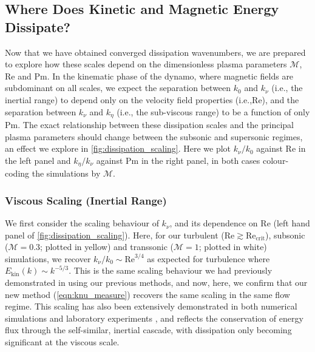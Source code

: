 \documentclass[12pt,twoside]{extreport}
\makeatletter
\newcommand{\mReh}{\ensuremath{\mathrm{Re}}} %
\newcommand{\mPrm}{\ensuremath{\mathrm{Pm}}} %
\newcommand{\mSonicMach}{\ensuremath{\mathcal{M}}} %
\newcommand{\ie}{i.e.,\xspace} %
\providecommand{\DIFaddtex}[1]{{\protect\color{DIFgreen}\uwave{#1}}} %
\providecommand{\DIFdeltex}[1]{{\protect\color{DIFpurple}\sout{#1}}} %
\providecommand{\DIFaddbegin}{} %
\providecommand{\DIFaddend}{} %
\providecommand{\DIFdelbegin}{} %
\providecommand{\DIFdelend}{} %
\providecommand{\DIFadd}[1]{\texorpdfstring{\DIFaddtex{#1}}{#1}} %
\providecommand{\DIFdel}[1]{\texorpdfstring{\DIFdeltex{#1}}{}} %
\providecommand{\DIFscaledelfig}{0.5}
\newlength{\DIFdelgraphicswidth} %
\newlength{\DIFdelgraphicsheight} %
\providecommand{\DIFaddincludegraphics}[2][]{{\color{DIFgreen}\fbox{\DIFOincludegraphics[#1]{#2}}}} %
\providecommand{\DIFdelincludegraphics}[2][]{%
\sbox{\DIFdelgraphicsbox}{\DIFOincludegraphics[#1]{#2}}%
\settoboxwidth{\DIFdelgraphicswidth}{\DIFdelgraphicsbox} %
\settoboxtotalheight{\DIFdelgraphicsheight}{\DIFdelgraphicsbox} %
\scalebox{\DIFscaledelfig}{%
\parbox[b]{\DIFdelgraphicswidth}{\usebox{\DIFdelgraphicsbox}\\[-\baselineskip] \rule{\DIFdelgraphicswidth}{0em}}\llap{\resizebox{\DIFdelgraphicswidth}{\DIFdelgraphicsheight}{%
\setlength{\unitlength}{\DIFdelgraphicswidth}%
\begin{picture}(1,1)%
\thicklines\linethickness{2pt} %
{\color{DIFpurple}\put(0,0){\framebox(1,1){}}}%
{\color{DIFpurple}\put(0,0){\line( 1,1){1}}}%
{\color{DIFpurple}\put(0,1){\line(1,-1){1}}}%
\end{picture}%
}\hspace*{3pt}}} %
} %
\DeclareRobustCommand{\DIFaddbegin}{\DIFOaddbegin \let\includegraphics\DIFaddincludegraphics} %
\DeclareRobustCommand{\DIFaddend}{\DIFOaddend \let\includegraphics\DIFOincludegraphics} %
\DeclareRobustCommand{\DIFdelbegin}{\DIFOdelbegin \let\includegraphics\DIFdelincludegraphics} %
\DeclareRobustCommand{\DIFdelend}{\DIFOaddend \let\includegraphics\DIFOincludegraphics} %
\let\sout@orig\sout %
\renewcommand{\sout}[1]{\ifmmode\text{\sout@orig{\ensuremath{#1}}}\else\sout@orig{#1}\fi} %
\makeatother
\begin{document}
\DIFaddend \subsection{Where Does Kinetic and Magnetic Energy Dissipate?}
\label{sec:results:dissipation}

Now that we have obtained converged dissipation wavenumbers, we are prepared to explore how these scales depend on the dimensionless plasma parameters $\mSonicMach$, $\mReh$ and $\mPrm$. In the kinematic phase of the dynamo, where magnetic fields are subdominant on all scales, we expect the separation between \DIFdelbegin \DIFdel{$k_0$ }\DIFdelend \DIFaddbegin \DIFadd{$k_\mathrm{turb}$ }\DIFaddend and $k_\nu$ (\ie the inertial range) to depend only on the velocity field properties (\ie $\mReh$), and the separation between $k_\nu$ and $k_\eta$ (\ie the sub-viscous range) to be a function of only $\mPrm$. The exact relationship between these dissipation scales and the principal plasma parameters should change between the subsonic and supersonic regimes, an effect we explore in \autoref{fig:dissipation_scaling}. Here we plot \DIFdelbegin \DIFdel{$k_\nu / k_0$ }\DIFdelend \DIFaddbegin \DIFadd{$k_\nu / k_\mathrm{turb}$ }\DIFaddend against $\mReh$ in the left panel and $k_\eta / k_\nu$ against $\mPrm$ in the right panel, in both cases colour-coding the simulations by $\mSonicMach$.

\subsubsection{Viscous Scaling (Inertial Range)}
\label{sec:results:dissipation:knu}

We first consider the scaling behaviour of $k_\nu$, and its dependence on $\mReh$ (left hand panel of \autoref{fig:dissipation_scaling}). Here, for our turbulent ($\mReh \gtrsim \mReh_\mathrm{crit}$), subsonic ($\mSonicMach = 0.3$; plotted in yellow) and transsonic ($\mSonicMach = 1$; plotted in white) simulations, we recover \DIFdelbegin \DIFdel{$k_\nu / k_0 \sim \mReh^{3/4}$ }\DIFdelend \DIFaddbegin \DIFadd{$k_\nu / k_\mathrm{turb} \sim \mReh^{3/4}$ }\DIFaddend as expected for \citet{kolmogorov1941dissipation} turbulence where $E_{\mathrm{kin}}(k) \sim k^{-5/3}$. This is the same scaling behaviour we had previously demonstrated in  using our previous methods, and now, here, we confirm that our new method (\autoref{eqn:knu_measure}) recovers the same scaling in the same flow regime. This scaling has also been extensively demonstrated in both numerical simulations \citep{yeung1997universality, schumacher2007sub, schumacher2014small} and laboratory experiments \citep{barenblatt1997scaling}, and reflects the conservation of energy flux through the self-similar, inertial cascade, with dissipation only becoming significant at the viscous scale.
\end{document}

